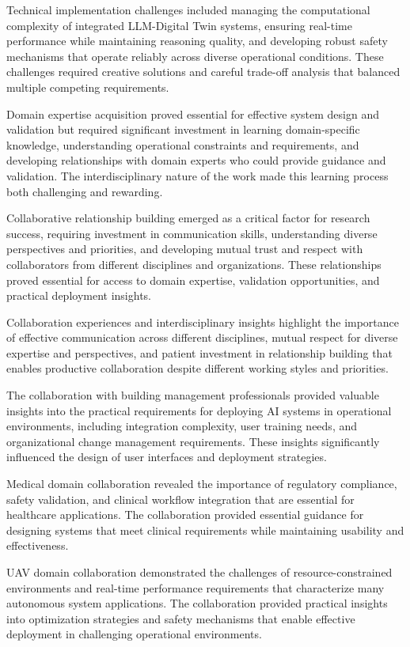 Technical implementation challenges included managing the computational complexity of integrated LLM-Digital Twin systems, ensuring real-time performance while maintaining reasoning quality, and developing robust safety mechanisms that operate reliably across diverse operational conditions. These challenges required creative solutions and careful trade-off analysis that balanced multiple competing requirements.

Domain expertise acquisition proved essential for effective system design and validation but required significant investment in learning domain-specific knowledge, understanding operational constraints and requirements, and developing relationships with domain experts who could provide guidance and validation. The interdisciplinary nature of the work made this learning process both challenging and rewarding.

Collaborative relationship building emerged as a critical factor for research success, requiring investment in communication skills, understanding diverse perspectives and priorities, and developing mutual trust and respect with collaborators from different disciplines and organizations. These relationships proved essential for access to domain expertise, validation opportunities, and practical deployment insights.

Collaboration experiences and interdisciplinary insights highlight the importance of effective communication across different disciplines, mutual respect for diverse expertise and perspectives, and patient investment in relationship building that enables productive collaboration despite different working styles and priorities.

The collaboration with building management professionals provided valuable insights into the practical requirements for deploying AI systems in operational environments, including integration complexity, user training needs, and organizational change management requirements. These insights significantly influenced the design of user interfaces and deployment strategies.

Medical domain collaboration revealed the importance of regulatory compliance, safety validation, and clinical workflow integration that are essential for healthcare applications. The collaboration provided essential guidance for designing systems that meet clinical requirements while maintaining usability and effectiveness.

UAV domain collaboration demonstrated the challenges of resource-constrained environments and real-time performance requirements that characterize many autonomous system applications. The collaboration provided practical insights into optimization strategies and safety mechanisms that enable effective deployment in challenging operational environments.

